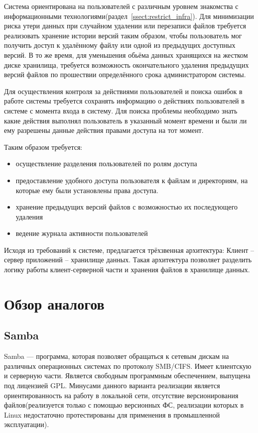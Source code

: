 \documentclass[utf8,usehyperref,12pt]{G7-32}
\begin{document}
Система ориентирована на пользователей с различным уровнем знакомства с информационными технологиями(раздел~\ref{ssect:restrict_infra}). Для минимизации риска утери данных при случайном удалении или перезаписи файлов требуется реализовать хранение истории версий таким образом, чтобы пользователь мог получить доступ к удалённому файлу или одной из предыдущих доступных версий. В то же время, для уменьшения обьёма данных хранящихся на жестком диске хранилища, требуется возможность окончательного удаления предыдущих версий файлов по прошествии определённого срока администратором системы.

Для осуществления контроля за действиями пользователей и поиска ошибок в работе системы требуется сохранять информацию о действиях пользователей в системе с момента входа в систему. Для поиска проблемы необходимо знать какие действия выполнял пользователь в указанный момент времени и были ли ему разрешены данные действия правами доступа на тот момент.

Таким образом требуется:
\begin{itemize}
\item осуществление разделения пользователей по ролям доступа
\item предоставление удобного доступа пользователя к файлам и директориям, на которые ему были установлены права доступа.
\item хранение предыдущих версий файлов с возможностью их последующего удаления
\item ведение журнала активности пользователей
\end{itemize}

Исходя из требований к системе, предлагается трёхзвенная архитектура: Клиент -- сервер приложений -- хранилище данных. Такая архитектура позволяет разделить логику работы клиент-серверной части и хранения файлов в хранилище данных. 

\section{Обзор аналогов}
\subsection{Samba}

Samba — программа, которая позволяет обращаться к сетевым дискам на различных операционных системах по протоколу SMB/CIFS. 
Имеет клиентскую и серверную части. Является свободным программным обеспечением, выпущена под лицензией GPL.
Минусами данного варианта реализации является ориентированность на работу в локальной сети, отсутствие версионирования файлов(реализуется только с помощью версионных ФС, реализации которых в Linux недостаточно протестированы для применения в промышленной эксплуатации).
\end{document}
